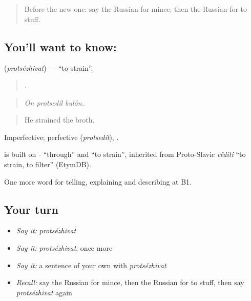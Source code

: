 \label{lesson:RU-C334-protsezhivat}



\begin{quote}
Before the new one: say the Russian for mince, then the Russian for to stuff.
\end{quote}

\subsection*{You'll want to know: }
\textbf{} (\emph{protsézhivat}) — \textquotedblleft{}to strain\textquotedblright{}.

\begin{quote}
  .
\end{quote}

\begin{quote}
\emph{On protsedíl bulón.}
\end{quote}

\begin{quote}
He strained the broth.
\end{quote}

Imperfective; perfective \emph{} (\emph{protsedít}), \emph{}.

\begin{cousinweb}
\emph{} is built on \emph{-} \textquotedblleft{}through\textquotedblright{} and \emph{} \textquotedblleft{}to strain\textquotedblright{}, inherited from Proto-Slavic \emph{cěditi} \textquotedblleft{}to strain, to filter\textquotedblright{} (EtymDB).
\end{cousinweb}

\begin{grammarlens}[title={What you've built}]
One more word for telling, explaining and describing at B1.
\end{grammarlens}

\subsection*{Your turn}
\begin{itemize}
\raggedright
  \item \emph{Say it:} \emph{protsézhivat}
  \item \emph{Say it:} \emph{protsézhivat}, once more
  \item \emph{Say it:} a sentence of your own with \emph{protsézhivat}
  \item \emph{Recall:} say the Russian for mince, then the Russian for to stuff, then say \emph{protsézhivat} again
\end{itemize}

